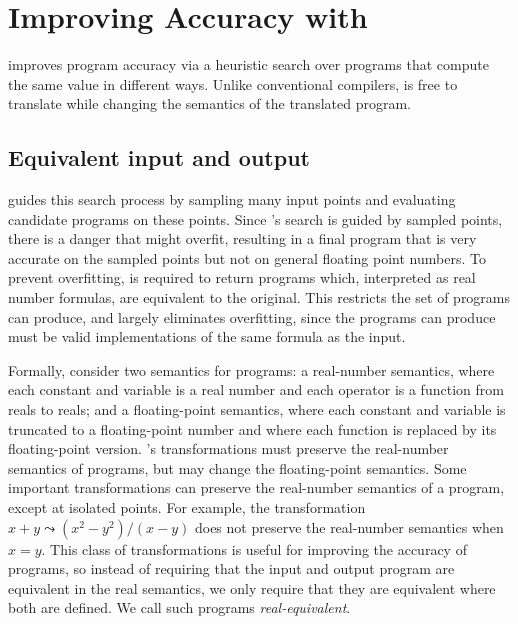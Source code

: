 \documentclass[paper.tex]{subfiles}
\begin{document}
\section{Improving Accuracy with  \casio}
\label{sec:synthesis}



\casio improves program accuracy via a heuristic search
  over programs that compute the same value in different ways.
Unlike conventional compilers, \casio is free
  to translate while changing the semantics of the translated program.

\subsection{Equivalent input and output}

\casio guides this search process by sampling many input points
  and evaluating candidate programs on these points.
Since \casio's search is guided by sampled points,
  there is a danger that \casio might overfit,
  resulting in a final program that is very accurate on the sampled points
  but not on general floating point numbers.
To prevent overfitting, \casio is required to return
  programs which, interpreted as real number formulas,
  are equivalent to the original.
This restricts the set of programs \casio can produce,
  and largely eliminates overfitting,
  since the programs \casio can produce must be valid implementations
  of the same formula as the input.

Formally, consider two semantics for programs:
  a real-number semantics,
  where each constant and variable is a real number
  and each operator is a function from reals to reals;
  and a floating-point semantics,
  where each constant and variable is truncated to a floating-point number
  and where each function is replaced by its floating-point version.
\casio's transformations must preserve the real-number semantics of programs,
  but may change the floating-point semantics.
Some important transformations
  can preserve the real-number semantics of a program,
  except at isolated points.
For example, the transformation $x + y \leadsto (x^2 - y^2)/(x - y)$
  does not preserve the real-number semantics when $x = y$.
This class of transformations is useful for improving the accuracy of programs,
  so instead of requiring that the input and output program
  are equivalent in the real semantics,
  we only require that they are equivalent where both are defined.
We call such programs \emph{real-equivalent}.
\end{document}
